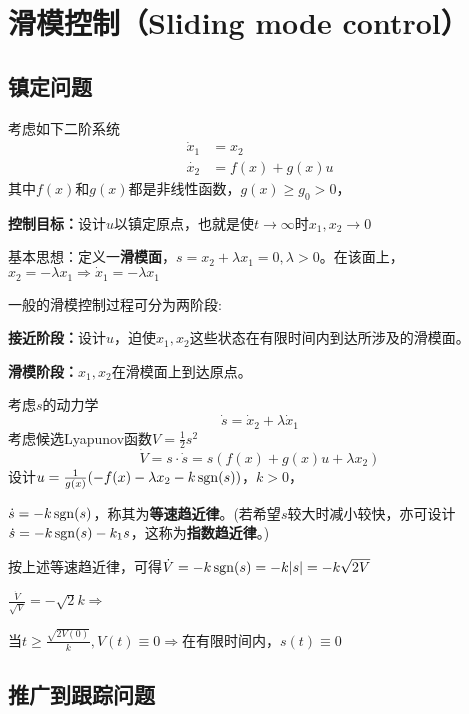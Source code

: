 \section{滑模控制（Sliding mode control）}\label{5Cref}

\subsection{镇定问题}

\begin{example}
  考虑如下二阶系统
  \begin{align*}
      \dot{x}_1 & = x_2\\
       \dot{x_2} & = f (x) + g (x) u
  \end{align*}
  其中$f (x)$和$g (x)$都是非线性函数，$g (x) \geq g_0 > 0$，
  
  \textbf{控制目标：}设计$u$以镇定原点，也就是使$t
  \rightarrow \infty $时$ x_1, x_2 \rightarrow 0$
  
  基本思想：定义一\textbf{滑模面}，$s = x_2 + \lambda x_1 = 0,
  \lambda > 0$。在该面上，$x_2 = - \lambda x_1 \Rightarrow \dot{x}_1 = -
  \lambda x_1$
  
  一般的滑模控制过程可分为两阶段:
  
  \textbf{接近阶段：}设计$u$，迫使$x_1, x_2$这些状态在有限时间内到达所涉及的滑模面。
  
  \textbf{滑模阶段：}$x_1, x_2$在滑模面上到达原点。
  
  考虑$s$的动力学
  \[ \dot{s} = \dot{x}_2 + \lambda \dot{x}_1 \]
  考虑候选Lyapunov函数$V = \frac{1}{2} s^2$
  \[ \dot{V} = s \cdot \dot{s} = s (f (x) + g (x) u + \lambda x_2) \]
  设计$u = \frac{1}{g (x)} (- f (x) - \lambda x_2 - k \operatorname{sgn} (s))$，$k
  > 0$，
  
  $\dot{s} = - k \operatorname{sgn} (s)$，称其为\textbf{等速趋近律}。(若希望$s$较大时减小较快，亦可设计$\dot{s}
  = - k \operatorname{sgn} (s) - k_1 s$，这称为\textbf{指数趋近律}。)
  
  按上述等速趋近律，可得$\dot{V} = - k \operatorname{sgn} (s) = - k | s | =
  - k \sqrt{2 V}$
  
  $\frac{\dot{V}}{\sqrt{V}} = - \sqrt{2} k \Rightarrow$
  
  当$t \geq \frac{\sqrt{2 V (0)}}{k}, V (t) \equiv 0 \Rightarrow
  $在有限时间内，$s (t) \equiv 0$
\end{example}

\subsection{推广到跟踪问题}

